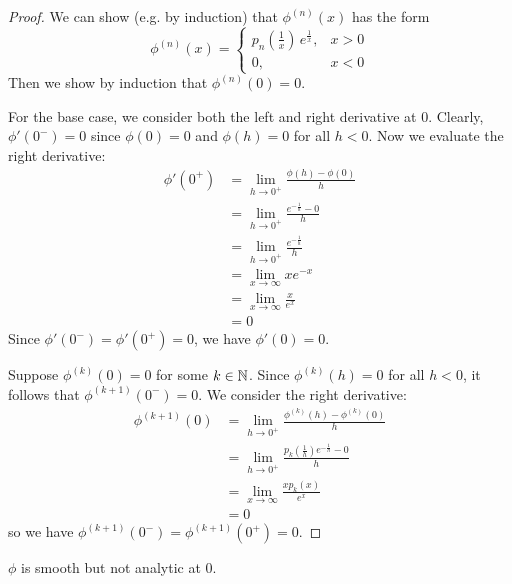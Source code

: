 \begin{proof}
  We can show (e.g. by induction) that $\phi ^ {(n)} (x)$ has the form 
  \[
    \phi ^ {(n)} (x) =
    \begin{cases}
      p_n\left(\frac{1}{x}\right) \, e ^ \frac{1}{x}, & x > 0 \\ 
      0, & x < 0
    \end{cases}
  \]
  Then we show by induction that $\phi ^ {(n)} (0) = 0$. 

  For the base case, we consider both the left and right derivative at 0. Clearly, $\phi'(0 ^ -) = 0$ since $\phi(0) = 0$ and $\phi(h) = 0$ for all $h < 0$. Now we evaluate the right derivative:
  \begin{align*}
    \phi'(0 ^ +) &= \lim_{h \to 0 ^ +} \frac{\phi(h) - \phi(0)}{h} \\ 
    &= \lim_{h \to 0 ^ +} \frac{e ^ {-\frac{1}{h}} - 0}{h} \\ 
    &= \lim_{h \to 0 ^ +} \frac{e ^ {-\frac{1}{h}}}{h} \\ 
    &= \lim_{x \to \infty} xe ^ {-x} \\ 
    &= \lim_{x \to \infty} \frac{x}{e ^ x} \\ 
    &= 0
  \end{align*}
  Since $\phi'(0 ^ -) = \phi'(0 ^ +) = 0$, we have $\phi'(0) = 0$. 

  Suppose $\phi ^ {(k)} (0) = 0$ for some $k \in \mathbb{N}$. Since $\phi ^ {(k)} (h) = 0$ for all $h < 0$, it follows that $\phi ^ {(k + 1)} (0 ^ -) = 0$. We consider the right derivative:
  \begin{align*}
    \phi ^ {(k + 1)} (0) &= \lim_{h \to 0 ^ +} \frac{\phi ^ {(k)} (h) - \phi ^ {(k)} (0)}{h} \\ 
    &= \lim_{h \to 0 ^ +} \frac{p_k\left(\frac{1}{h}\right) e ^ {-\frac{1}{h}} - 0}{h} \\ 
    &= \lim_{x \to \infty} \frac{x p_k(x)}{e ^ x} \\ 
    &= 0
  \end{align*}
  so we have $\phi ^ {(k + 1)} (0 ^ -) = \phi ^ {(k + 1)} (0 ^ +) = 0$.
\end{proof}
\begin{corollary}
  $\phi$ is smooth but not analytic at 0.
\end{corollary}
